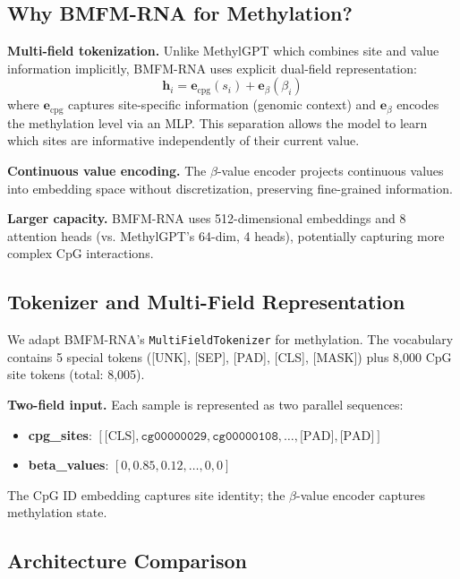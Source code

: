 \documentclass[11pt]{article}
\begin{document}
\subsection{Why BMFM-RNA for Methylation?}

\textbf{Multi-field tokenization.} Unlike MethylGPT which combines site and value information implicitly, BMFM-RNA uses explicit dual-field representation:
\begin{equation}
\mathbf{h}_i = \mathbf{e}_{\text{cpg}}(s_i) + \mathbf{e}_{\beta}(\beta_i)
\end{equation}
where $\mathbf{e}_{\text{cpg}}$ captures site-specific information (genomic context) and $\mathbf{e}_{\beta}$ encodes the methylation level via an MLP. This separation allows the model to learn which sites are informative independently of their current value.

\noindent\textbf{Continuous value encoding.} The $\beta$-value encoder projects continuous values into embedding space without discretization, preserving fine-grained information.

\noindent\textbf{Larger capacity.} BMFM-RNA uses 512-dimensional embeddings and 8 attention heads (vs. MethylGPT's 64-dim, 4 heads), potentially capturing more complex CpG interactions.

\subsection{Tokenizer and Multi-Field Representation}

We adapt BMFM-RNA's \texttt{MultiFieldTokenizer} for methylation. The vocabulary contains 5 special tokens ([UNK], [SEP], [PAD], [CLS], [MASK]) plus 8{,}000 CpG site tokens (total: 8{,}005).

\noindent \textbf{Two-field input.} Each sample is represented as two parallel sequences:
\begin{itemize}[leftmargin=1.5em]
\item \textbf{cpg\_sites}: $[\text{[CLS]}, \texttt{cg00000029}, \texttt{cg00000108}, \ldots, \text{[PAD]}, \text{[PAD]}]$
\item \textbf{beta\_values}: $[0, 0.85, 0.12, \ldots, 0, 0]$
\end{itemize}
The CpG ID embedding captures site identity; the $\beta$-value encoder captures methylation state.

\subsection{Architecture Comparison}
\end{document}
